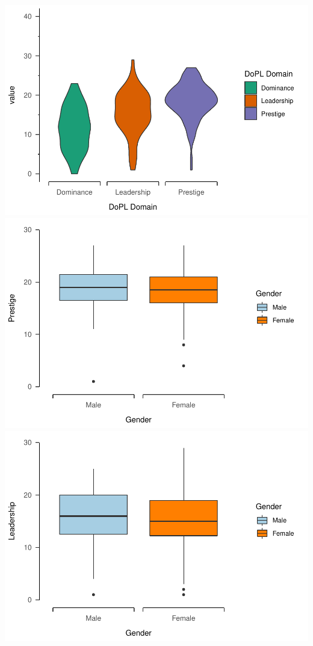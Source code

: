 \documentclass[
  english,
  a4paper,floatsintext]{apa7}
\begin{document}
\includegraphics{DoPL-Experiment_files/figure-latex/unnamed-chunk-3-1.pdf} \includegraphics{DoPL-Experiment_files/figure-latex/unnamed-chunk-3-2.pdf} \includegraphics{DoPL-Experiment_files/figure-latex/unnamed-chunk-3-3.pdf}
\end{document}
